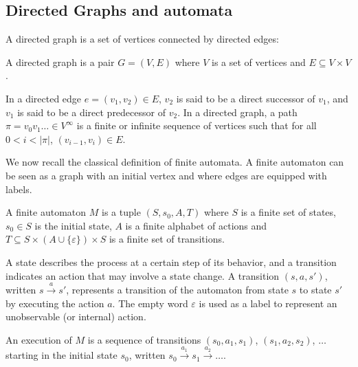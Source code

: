  	\subsection{Directed Graphs and automata}
	\label{subsec:automata}
	A directed graph is a set of vertices connected by directed edges:
	\begin{definition}
	A directed graph is a pair $G=(V,E)$ where $V$ is a set of vertices
	and $E \subseteq V \times V$.
	\end{definition}
	
	In a directed edge $e = (v_1, v_2) \in E$, 
	$v_2$ is said to be a direct successor of $v_1$, and 
	$v_1$ is said to be a direct predecessor of $v_2$.
	In a directed graph, a path $\pi = v_0v_1\dots \in V^\infty$ is a finite or infinite sequence of vertices  
	such that for all $0< i < |\pi|$,  $(v_{i-1},v_{i}) \in E$.
	
	
	We now recall the classical definition of finite automata. A finite automaton can be seen as a graph with an initial vertex 
	and where edges are equipped with labels.
	
	\begin{definition} 
		A finite automaton $M$  is a tuple
  $(S,s_0,A,T)$ where $S$ is a finite set of states, $s_0 \in
  S$ is the initial state, $A$ is a finite alphabet of actions
  and $T \subseteq S \times (A \cup \{ \varepsilon\}) \times S$
  is a finite set of transitions.
\end{definition} 

A state describes the process at a certain step of its behavior, and
a transition indicates an action that may involve a state change.  A
transition $(s,a,s')$, written $s\xrightarrow{a}s'$, represents a
transition of the automaton from state $s$ to state $s'$ by executing
the action $a$.  The empty word $\varepsilon$ is used as a label to
represent an unobservable (or internal) action.

An execution of $M$ is a sequence of transitions $(s_0,a_1,s_1)$,
$(s_1,a_2,s_2)$, $\dots$ starting in the
initial state $s_0$, written
$s_0\xrightarrow{a_1}s_1\xrightarrow{a_2}\dots$.

